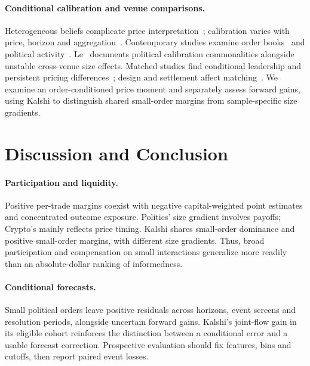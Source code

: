 \documentclass[sigconf,anonymous,nonacm,balance=false]{acmart}
\begin{document}
\paragraph{Conditional calibration and venue comparisons.}
Heterogeneous beliefs complicate price interpretation~\cite{manski2006interpreting,wolfers2006interpreting}; calibration varies with price, horizon and aggregation~\cite{snowberg2010explaining,page2013prediction,cardozo2026favorite,reichenbach2026exploring,kagan2026calibration}. Contemporary studies examine order books~\cite{dubach2026anatomy} and political activity~\cite{tsang2026anatomy,tsang2026political,chen2025political}. Le~\cite{le2026decomposing} documents political calibration commonalities alongside unstable cross-venue size effects. Matched studies find conditional leadership and persistent pricing differences~\cite{ng2026discovery,aktug2026discovery,rothschild2014misalignment,zitzewitz2026limits}; design and settlement affect matching~\cite{lee2026derivatives,gebele2026semantic}. We examine an order-conditioned price moment and separately assess forward gains, using Kalshi to distinguish shared small-order margins from sample-specific size gradients.

\newpage
\section{Discussion and Conclusion}
\label{sec:discuss}
\paragraph{Participation and liquidity.}
Positive per-trade margins coexist with negative capital-weighted point estimates and concentrated outcome exposure. Politics' size gradient involves payoffs; Crypto's mainly reflects price timing. Kalshi shares small-order dominance and positive small-order margins, with different size gradients. Thus, broad participation and compensation on small interactions generalize more readily than an absolute-dollar ranking of informedness.

\paragraph{Conditional forecasts.}
Small political orders leave positive residuals across horizons, event screens and resolution periods, alongside uncertain forward gains. Kalshi's joint-flow gain in its eligible cohort reinforces the distinction between a conditional error and a usable forecast correction. Prospective evaluation should fix features, bins and cutoffs, then report paired event losses.
\end{document}
